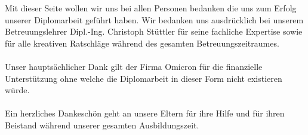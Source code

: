 Mit dieser Seite wollen wir uns bei allen Personen bedanken die uns zum Erfolg unserer Diplomarbeit geführt haben. 
Wir bedanken uns ausdrücklich bei unserem Betreuungslehrer Dipl.-Ing. Christoph Stüttler für seine fachliche Expertise sowie für alle kreativen Ratschläge während des 
gesamten Betreuungszeitraumes. \\
\\
Unser hauptsächlicher Dank gilt der Firma Omicron für die finanzielle Unterstützung ohne welche die Diplomarbeit in dieser Form nicht existieren würde.\\ \\
Ein herzliches Dankeschön geht an unsere Eltern für ihre Hilfe und für ihren Beistand während unserer gesamten Ausbildungszeit.